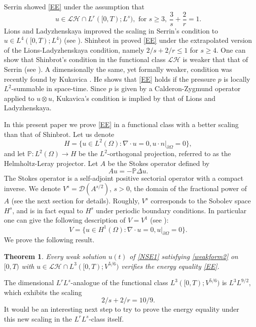 \documentclass[12pt]{amsart}
\theoremstyle{plain}
\newtheorem{theorem}[THEOREM]{Theorem}
\theoremstyle{definition}
\theoremstyle{remark}
\begin{document}
Serrin \cite{Ser63} showed \eqref{EE} under the assumption that 
\begin{equation}
 u\in {\mathcal{LH}} \cap L^r([0,T);L^s), \text{ for } s \geq 3,\ \frac{3}{s}+\frac{2}{r} = 1.
\end{equation}
Lions and Ladyzhenskaya improved the scaling in Serrin's condition to $u
\in L^4([0,T);L^4)$ (see \cite{LSU,Lions}). Shinbrot in \cite{Shinbrot}
proved \eqref{EE} under the extrapolated version of the
Lions-Ladyzhenskaya condition, namely $2/s+2/r \leq 1$ for $s \geq
4$. One can show that Shinbrot's condition in the functional class
${\mathcal{LH}}$ is weaker that that of Serrin (see \cite{Galdi}). A
dimensionally the same, yet formally weaker, condition was recently
found by Kukavica \cite{Kuk06}. He shows that \eqref{EE} holds if
the pressure $p$ is locally $L^2$-summable in space-time. Since $p$
is given by a Calderon-Zygmund operator applied to $u\otimes u$,
Kukavica's condition is implied by that of Lions and Ladyzhenskaya.

In this present paper we prove \eqref{EE} in a functional class 
with a better scaling than that of Shinbrot. Let us denote
\begin{equation}\label{H}
H=\{u\in L^2({\Omega}): \nabla\cdot u =0, u\cdot n|_{\partial{\Omega}}=0\},
\end{equation}
and let $\mathbb{P} : L^2(\Omega) \to H$ be the $L^2$-orthogonal
projection, referred to as the Helmholtz-Leray projector. Let $A$ be
the Stokes operator defined by \begin{equation}\label{A} Au = -\mathbb{P}\Delta
u. \end{equation} The Stokes operator is a self-adjoint positive sectorial
operator with a compact inverse. We denote $V^{s} =
\mathcal{D}(A^{s/2})$, $s>0$, the domain of the fractional power of
$A$ (see the next section for details). Roughly, $V^{s}$ corresponds
to the Sobolev space $H^s$, and is in fact equal to $H^{s}$ under
periodic boundary conditions. In particular one can give the
following description of $V=V^1$ (see \cite{CF}): 
\begin{equation}\label{V}
V=\{u\in H^1({\Omega}): \nabla\cdot u =0, u|_{\partial{\Omega}}=0\}. 
\end{equation} 
We prove the following result.
\begin{theorem}\label{T:main}
Every weak solution $u(t)$ of \eqref{NSE1} satisfying \eqref{weakform2} on $[0,T)$ with $u \in
{\mathcal{LH}} \cap L^3([0,T); V^{5/6})$ verifies the energy equality
\eqref{EE}.
\end{theorem}
The dimensional $L^rL^s$-analogue of the functional class
$L^3([0,T); V^{5/6})$ is $L^3L^{9/2}$, which exhibits the scaling
\begin{equation}\label{new}
2/s+2/r = 10/9.
\end{equation}
It would be an interesting next step to try to prove the energy equality under this new
scaling in the $L^rL^s$-class itself.
\end{document}
